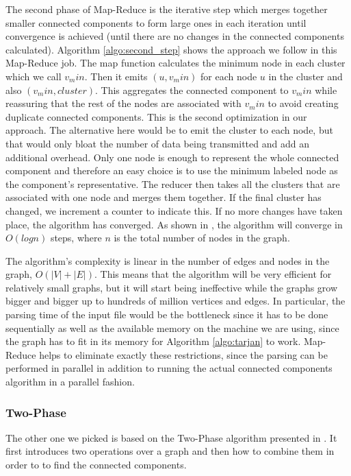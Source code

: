 The second phase of Map-Reduce is the iterative step which merges together smaller connected components to form large ones in each iteration until convergence is achieved (\ie until there are no changes in the connected components calculated). Algorithm \ref{algo:second_step} shows the approach we follow in this Map-Reduce job. The map function calculates the minimum node in each cluster which we call $v_min$. Then it emits $(u, v_min)$ for each node $u$ in the cluster and also $(v_min, cluster)$. This aggregates the connected component to $v_min$ while reassuring that the rest of the nodes are associated with $v_min$ to avoid creating duplicate connected components. This is the second optimization in our approach. The alternative here would be to emit the cluster to each node, but that would only bloat the number of data being transmitted and add an additional overhead. Only one node is enough to represent the whole connected component and therefore an easy choice is to use the minimum labeled node as the component's representative. The reducer then takes all the clusters that are associated with one node and merges them together. If the final cluster has changed, we increment a counter to indicate this. If no more changes have taken place, the algorithm has converged. As shown in \cite{rastogi}, the algorithm will converge in $O(logn)$ steps, where $n$ is the total number of nodes in the graph.

The algorithm's complexity is linear in the number of edges and nodes in the graph, \ie $O(|V| + |E|)$. This means that the algorithm will be very efficient for relatively small graphs, but it will start being ineffective while the graphs grow bigger and bigger up to hundreds of million vertices and edges. In particular, the parsing time of the input file would be the bottleneck since it has to be done sequentially as well as the available memory on the machine we are using, since the graph has to fit in its memory for Algorithm \ref{algo:tarjan} to work. Map-Reduce helps to eliminate exactly these restrictions, since the parsing can be performed in parallel in addition to running the actual connected components algorithm in a parallel fashion.

\subsubsection{Two-Phase}

The other one we picked is based on the Two-Phase algorithm presented in \cite{kiveris}. It first introduces two operations over a graph and then how to combine them in order to to find the connected components.

